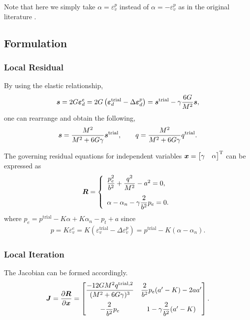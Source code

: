 Note that here we simply take $\alpha=\varepsilon^p_v$ instead of $\alpha=-\varepsilon^p_v$ as in the original literature \cite{SouzaNeto2008}.
\subsection{Formulation}
\subsubsection{Local Residual}
By using the elastic relationship,
\begin{gather}
\bm{s}=2G\bm{\varepsilon}^e_d=2G\left(\bm{\varepsilon}^\text{trial}_d-\Delta\bm{\varepsilon}^p_d\right)=\bm{s}^\text{trial}-\gamma\dfrac{6G}{M^2}\bm{s},
\end{gather}
one can rearrange and obtain the following,
\begin{gather}
\bm{s}=\dfrac{M^2}{M^2+6G\gamma}\bm{s}^\text{trial},\qquad
q=\dfrac{M^2}{M^2+6G\gamma}q^\text{trial}.
\end{gather}

The governing residual equations for independent variables $\bm{x}=\begin{bmatrix}\gamma&\alpha\end{bmatrix}^\mathrm{T}$ can be expressed as
\begin{gather}
\bm{R}=\left\{\begin{array}{l}
\dfrac{p_e^2}{b^2}+\dfrac{q^2}{M^2}-a^2=0,\\[4mm]
\alpha-\alpha_n-\gamma\dfrac{2}{b^2}p_e=0.
\end{array}\right.
\end{gather}
where $p_e=p^\text{trial}-K\alpha+K\alpha_n-p_t+a$ since
\begin{gather}
p=K\varepsilon^e_v=K\left(\varepsilon^\text{trial}_v-\Delta\varepsilon^p_v\right)=p^\text{trial}-K\left(\alpha-\alpha_n\right).
\end{gather}
\subsubsection{Local Iteration}
The Jacobian can be formed accordingly.
\begin{gather}
\bm{J}=\dfrac{\partial{\bm{R}}}{\partial{\bm{x}}}=\begin{bmatrix}
\dfrac{-12GM^2q^{\text{trial},2}}{(M^2+6G\gamma)^3}&\dfrac{2}{b^2}p_e(a'-K)-2aa'\\[4mm]
-\dfrac{2}{b^2}p_e&1-\gamma\dfrac{2}{b^2}(a'-K)
\end{bmatrix}.
\end{gather}

